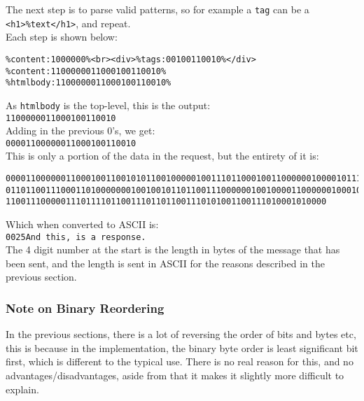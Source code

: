 The next step is to parse valid patterns, so for example a \texttt{tag} can be a \texttt{<h1>\%text</h1>}, and repeat.\\
Each step is shown below:
\begin{lstlisting}[numbers=none]
%content:1000000%<br><div><span>%tags:00110010%</span></div>
%content:1000000%<br><div>%tags:00100110010%</div>
%content:1100000011000100110010%
%htmlbody:1100000011000100110010%
\end{lstlisting}
As \texttt{htmlbody} is the top-level, this is the output:\\
\texttt{1100000011000100110010}\\
Adding in the previous 0's, we get:\\
\texttt{00001100000011000100110010}\\
This is only a portion of the data in the request, but the entirety of it is:
\begin{lstlisting}[numbers=none,breaklines=true,breakatwhitespace=false]
000011000000110001001100101011001000001001110110001001100000010000101110000101101001
011011001110001101000000010010010110110011100000010010000110000001000100111010100110
1100111000001110111101100111011011001110101001100111010001010000
\end{lstlisting}
Which when converted to ASCII is:\\
\texttt{0025And this, is a response.}\\
The 4 digit number at the start is the length in bytes of the message that has been sent, and the length is sent in ASCII for the reasons described in the previous section.

\subsubsection*{Note on Binary Reordering}
In the previous sections, there is a lot of reversing the order of bits and bytes etc, this is because in the implementation, the binary byte order is least significant bit first, which is different to the typical use. There is no real reason for this, and no advantages/disadvantages, aside from that it makes it slightly more difficult to explain.
